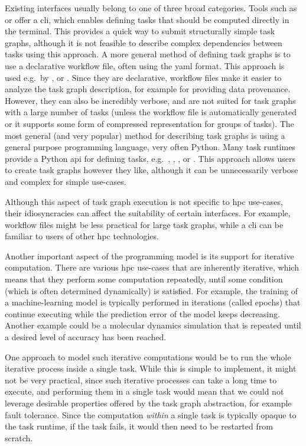 Existing interfaces usually belong to one of three broad categories. Tools such as
\gnuparallel{} or \hypershell{} offer a \gls{cli}, which enables
defining tasks that should be computed directly in the terminal. This provides a quick way to
submit structurally simple task graphs, although it is not feasible to describe complex
dependencies between tasks using this approach. A more general method of defining task graphs is to
use a declarative workflow file, often using the \gls{yaml} format. This approach is
used e.g.\ by \pegasus{}, \autosubmit{} or \merlin{}. Since
they are declarative, workflow files make it easier to analyze the task graph description, for
example for providing data provenance. However, they can also be incredibly verbose, and are not
suited for task graphs with a large number of tasks (unless the workflow file is automatically
generated or it supports some form of compressed representation for groups of tasks). The most
general (and very popular) method for describing task graphs is using a general purpose programming
language, very often Python. Many task runtimes provide a Python \gls{api} for
defining tasks, e.g.\ \dask{}, \ray{}, \parsl{},
\balsam{} or \pegasus{}. This approach allows users to create task
graphs however they like, although it can be unnecessarily verbose and complex for simple
use-cases.

Although this aspect of task graph execution is not specific to \gls{hpc} use-cases,
their idiosyncracies can affect the suitability of certain interfaces. For example, workflow files
might be less practical for large task graphs, while a \gls{cli} can be familiar to
users of other \gls{hpc} technologies.

Another important aspect of the programming model is its support for iterative computation.
There are various \gls{hpc} use-cases that are inherently iterative, which means that
they perform some computation repeatedly, until some condition (which is often determined
dynamically) is satisfied. For example, the training of a machine-learning model is typically
performed in iterations (called epochs) that continue executing while the prediction error of the
model keeps decreasing. Another example could be a molecular dynamics simulation that is repeated
until a desired level of accuracy has been reached.

One approach to model such iterative computations would be to run the whole iterative process
inside a single task. While this is simple to implement, it might not be very practical, since such
iterative processes can take a long time to execute, and performing them in a single task would
mean that we could not leverage desirable properties offered by the task graph abstraction, for
example fault tolerance. Since the computation \emph{within} a single task is typically
opaque to the task runtime, if the task fails, it would then need to be restarted from scratch.

